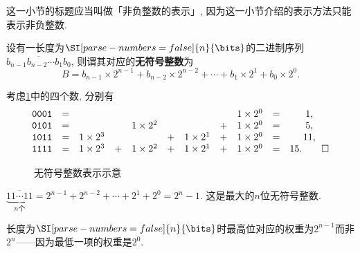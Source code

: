 \documentclass{ctexart}
\def\binaryseq#1{{\texttt{#1}}}
\begin{document}
这一小节的标题应当叫做「非负整数的表示」, 因为这一小节介绍的表示方法只能表示非负整数.
\begin{finale}
    \begin{definition}[无符号整数的编码]
        \label{def:无符号整数的编码}
        设有一长度为$\SI[parse-numbers=false]{n}{\bits}$的二进制序列$\overline{b_{n-1}b_{n-2}\cdots b_1b_0}$, 则谓其对应的\textbf{无符号整数}为
        \begin{equation}
            \label{eq:无符号整数的编码}
            B = b_{n-1} \times 2^{n-1} + b_{n-2} \times 2^{n-2} + \cdots + b_1 \times 2^1 + b_0 \times 2^0. 
        \end{equation}
    \end{definition}
\end{finale}
\begin{sample}
    \begin{ex}
        \label{ex:无符号整数四位示意}
        考虑\cref{fig:无符号整数表示示意}中的四个数, 分别有
        \[ \begin{array}{ccccccccccc}
            \text{\binaryseq{0001}} &=& & & & & & & 1\times 2^0 &=& 1,\\
            \text{\binaryseq{0101}} &=& & & 1\times 2^2 & & & +&1\times 2^0 &=& 5,\\
            \text{\binaryseq{1011}} &=& 1\times 2^3 & & & +&1\times 2^1 & +&1\times 2^0 &=& 11,\\
            \text{\binaryseq{1111}} &=& 1\times 2^3 & +&1\times 2^2 & +&1\times 2^1 & +&1\times 2^0 &=& 15. \qedhere
        \end{array} \]
    \end{ex}
\end{sample}
\begin{figure}[ht]
    \centering
    \caption{无符号整数表示示意}
    \label{fig:无符号整数表示示意}
\end{figure}
\begin{sample}
    \begin{ex}
        \label{ex:无符号整数极端值}
        $\displaystyle \underbrace{\overline{11\cdots 11}}_{n\text{个}} = 2^{n-1} + 2^{n-2} + \cdots + 2^1 + 2^0 = \boxed{2^n - 1.}$ 这是最大的$n$位无符号整数.
    \end{ex}
\end{sample}
\begin{pitfall}
    长度为$\SI[parse-numbers=false]{n}{\bits}$时最高位对应的权重为$2^{n-1}$而非$2^n$——因为最低一项的权重是$2^0$.
\end{pitfall}
\end{document}
